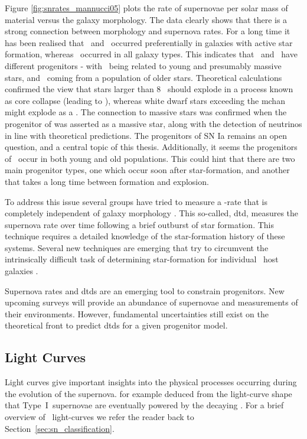 Figure \ref{fig:snrates_mannucci05} plots the rate of supernovae per solar mass of material versus the galaxy morphology. The data clearly shows that there is a strong connection between morphology and supernova rates. For a long time it has been realised that \sneii\ and \sneibc\ occurred preferentially in galaxies with active star formation, whereas \sneia\ occurred in all galaxy types. This indicates that \sneia\ and \sneiiibc\ have different progenitors - with \sneiiibc\ being related to young and presumably massive stars, and \sneia\ coming from a population of older stars. Theoretical calculations confirmed the view that stars larger than 8 \msun\ should explode in a process known as core collapse (leading to \sneiiibc), whereas white dwarf stars exceeding the \gls{mchan} might explode as a \snia. 
 The connection to massive stars was confirmed when the progenitor of  was asserted as a massive star, along with the detection of neutrinos in line with theoretical predictions. The progenitors of SN Ia remains an open question, and a central topic of this thesis. Additionally, it seems the progenitors of \sneia\ occur in both young and old populations. This could hint that there are two main progenitor types, one which occur soon after star-formation, and another that takes a long time between formation and explosion.

To address this issue several groups have tried to measure a \sneia-rate that is completely independent of galaxy morphology \citep[e.g.][]{2006MNRAS.370..773M, 2010ApJ...722.1879M}. This so-called, \gls{dtd}, measures the supernova rate over time following a brief outburst of star formation.
This technique requires a detailed knowledge of the star-formation history of these systems. Several new techniques are emerging that try to circumvent the intrinsically difficult task of determining star-formation for individual \sneia\ host galaxies \citep{2010MNRAS.407.1314M, 2010arXiv1010.5786B, 2008PASJ...60.1327T, 2010ApJ...722.1879M}.

Supernova rates and \glspl{dtd} are an emerging tool to constrain progenitors. New upcoming surveys will provide an abundance of supernovae and measurements of their environments.  However, fundamental uncertainties still exist on the theoretical front to predict \glspl{dtd} for a given progenitor model.

\subsection{Light Curves} 
\label{sec:intro_lc}
Light curves give important insights into the physical processes occurring during the evolution of the supernova. \cite{1982ApJ...253..785A} for example deduced from the light-curve shape that Type~I~supernovae are eventually powered by the decaying \Co. For a brief overview of \snii\ light-curves we refer the reader back to Section~\ref{sec:sn_classification}.


